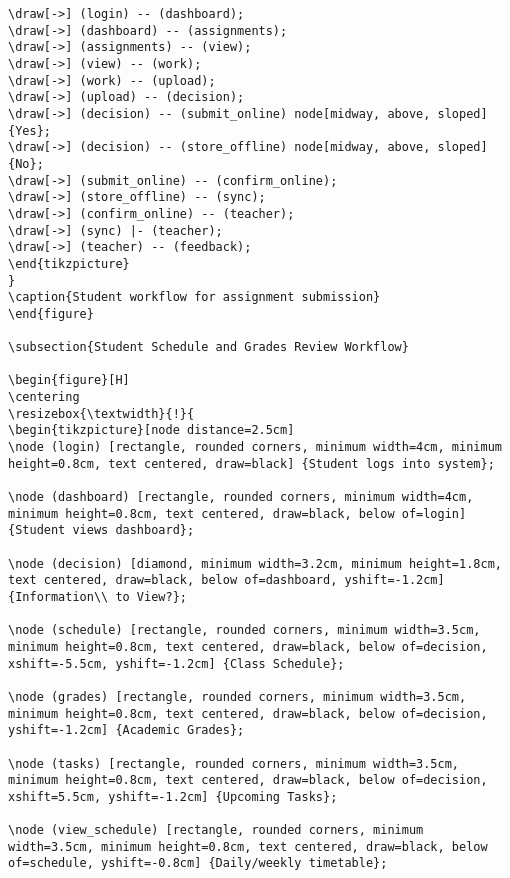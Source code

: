 \documentclass[11pt]{report}
\begin{document}
\begin{verbatim}
\draw[->] (login) -- (dashboard);
\draw[->] (dashboard) -- (assignments);
\draw[->] (assignments) -- (view);
\draw[->] (view) -- (work);
\draw[->] (work) -- (upload);
\draw[->] (upload) -- (decision);
\draw[->] (decision) -- (submit_online) node[midway, above, sloped] {Yes};
\draw[->] (decision) -- (store_offline) node[midway, above, sloped] {No};
\draw[->] (submit_online) -- (confirm_online);
\draw[->] (store_offline) -- (sync);
\draw[->] (confirm_online) -- (teacher);
\draw[->] (sync) |- (teacher);
\draw[->] (teacher) -- (feedback);
\end{tikzpicture}
}
\caption{Student workflow for assignment submission}
\end{figure}

\subsection{Student Schedule and Grades Review Workflow}

\begin{figure}[H]
\centering
\resizebox{\textwidth}{!}{
\begin{tikzpicture}[node distance=2.5cm]
\node (login) [rectangle, rounded corners, minimum width=4cm, minimum height=0.8cm, text centered, draw=black] {Student logs into system};

\node (dashboard) [rectangle, rounded corners, minimum width=4cm, minimum height=0.8cm, text centered, draw=black, below of=login] {Student views dashboard};

\node (decision) [diamond, minimum width=3.2cm, minimum height=1.8cm, text centered, draw=black, below of=dashboard, yshift=-1.2cm] {Information\\ to View?};

\node (schedule) [rectangle, rounded corners, minimum width=3.5cm, minimum height=0.8cm, text centered, draw=black, below of=decision, xshift=-5.5cm, yshift=-1.2cm] {Class Schedule};

\node (grades) [rectangle, rounded corners, minimum width=3.5cm, minimum height=0.8cm, text centered, draw=black, below of=decision, yshift=-1.2cm] {Academic Grades};

\node (tasks) [rectangle, rounded corners, minimum width=3.5cm, minimum height=0.8cm, text centered, draw=black, below of=decision, xshift=5.5cm, yshift=-1.2cm] {Upcoming Tasks};

\node (view_schedule) [rectangle, rounded corners, minimum width=3.5cm, minimum height=0.8cm, text centered, draw=black, below of=schedule, yshift=-0.8cm] {Daily/weekly timetable};


\end{verbatim}
\end{document}
